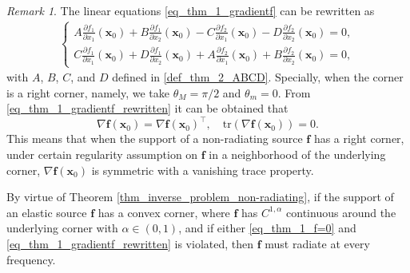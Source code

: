 \documentclass[11pt,reqno,oneside]{amsart}
\theoremstyle{definition}
\theoremstyle{remark}
\newtheorem{remark}{Remark}[section]
\numberwithin{equation}{section}
\numberwithin{equation}{section}
\theoremstyle{remark}
\begin{document}
\begin{remark}
	The linear equations  \eqref{eq_thm_1_gradientf}  can be rewritten as
	\begin{align} \label{eq_thm_1_gradientf_rewritten}
		\begin{cases}
			A \frac{\partial f_1}{\partial x_1}\left(\mathbf{x}_0\right) + B \frac{\partial f_1}{\partial x_2}\left(\mathbf{x}_0\right) - C \frac{\partial f_2}{\partial x_1}\left(\mathbf{x}_0\right) - D \frac{\partial f_2}{\partial x_2}\left(\mathbf{x}_0\right) = 0 , \\
			C \frac{\partial f_1}{\partial x_1}\left(\mathbf{x}_0\right) + D \frac{\partial f_1}{\partial x_2}\left(\mathbf{x}_0\right) + A \frac{\partial f_2}{\partial x_1}\left(\mathbf{x}_0\right) + B \frac{\partial f_2}{\partial x_2}\left(\mathbf{x}_0\right) = 0 ,
		\end{cases}
	\end{align}
	with $ A $, $ B $, $ C $, and $ D $ defined in \eqref{def_thm_2_ABCD}. Specially,  when the corner is a right corner, namely, we take  $ \theta_M=\pi/2 $ and $ \theta_m=0 $. From \eqref{eq_thm_1_gradientf_rewritten} it can be obtained that 
	$$
	\nabla \mathbf f(\mathbf x_0) = \nabla \mathbf f(\mathbf x_0)^\top,\quad \text{tr}\left(\nabla\mathbf{f}\left(\mathbf{x}_0\right)\right)=0. 
	$$
	This means that when the support of a non-radiating source $\mathbf f$ has a right corner, under certain regularity assumption on $\mathbf f$ in a neighborhood of the underlying corner, $\nabla \mathbf f(\mathbf x_0)$ is symmetric with a vanishing trace property. 
\end{remark} 

By virtue of Theorem \ref{thm_inverse_problem_non-radiating}, if the support of an elastic source $\mathbf{f}$ has a convex corner, where $\mathbf{f}$ has $C^{1,\alpha}$ continuous around the underlying corner with $\alpha \in (0,1)$, and if either \eqref{eq_thm_1_f=0} and \eqref{eq_thm_1_gradientf_rewritten} is   violated, then $\mathbf f$ must radiate at every  frequency. 
\end{document}
